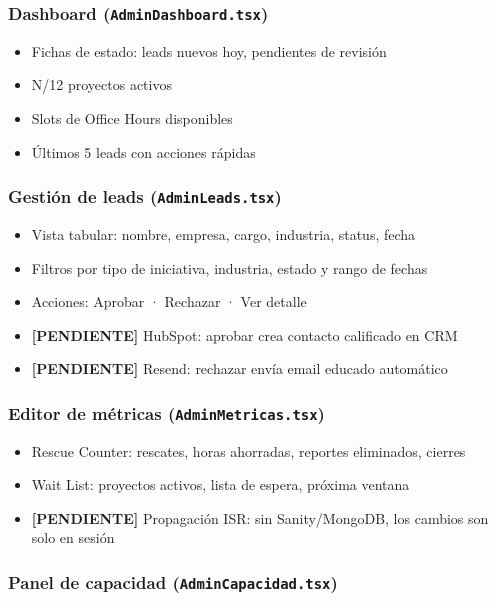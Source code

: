 \documentclass[11pt, a4paper]{article}
\newcommand{\ruta}[1]{\texttt{\color{accent2}#1}}
\newcommand{\pendientetag}{\textbf{\color{danger}[PENDIENTE]}}
\begin{document}
\subsubsection{Dashboard (\ruta{AdminDashboard.tsx})}

\begin{itemize}[leftmargin=*]
  \item Fichas de estado: leads nuevos hoy, pendientes de revisión
  \item N/12 proyectos activos
  \item Slots de Office Hours disponibles
  \item Últimos 5 leads con acciones rápidas
\end{itemize}

\subsubsection{Gestión de leads (\ruta{AdminLeads.tsx})}

\begin{itemize}[leftmargin=*]
  \item Vista tabular: nombre, empresa, cargo, industria, status, fecha
  \item Filtros por tipo de iniciativa, industria, estado y rango de fechas
  \item Acciones: Aprobar · Rechazar · Ver detalle
  \item \pendientetag{} HubSpot: aprobar crea contacto calificado en CRM
  \item \pendientetag{} Resend: rechazar envía email educado automático
\end{itemize}

\subsubsection{Editor de métricas (\ruta{AdminMetricas.tsx})}

\begin{itemize}[leftmargin=*]
  \item Rescue Counter: rescates, horas ahorradas, reportes eliminados, cierres
  \item Wait List: proyectos activos, lista de espera, próxima ventana
  \item \pendientetag{} Propagación ISR: sin Sanity/MongoDB, los cambios son solo en sesión
\end{itemize}

\subsubsection{Panel de capacidad (\ruta{AdminCapacidad.tsx})}
\end{document}
